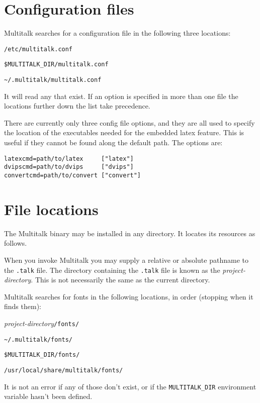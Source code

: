 \documentclass[12pt,a4paper,twoside]{article}
\renewcommand{\_}{\texttt{\symbol{95}}}
\begin{document}
\section{Configuration files}

Multitalk searches for a configuration file in the following three
locations:
\begin{bulletlist}
\item \verb^/etc/multitalk.conf^
\item \verb^$MULTITALK_DIR/multitalk.conf^
\item \verb^~/.multitalk/multitalk.conf^
\end{bulletlist}

It will read any that exist. If an option is specified in more than
one file the locations further down the list take precedence.

There are currently only three config file options, and they are all
used to specify the location of the executables needed for the embedded
latex feature. This is useful if they cannot be found along the default
path. The options are:

\begin{verbatim}
latexcmd=path/to/latex     ["latex"]
dvipscmd=path/to/dvips     ["dvips"]
convertcmd=path/to/convert ["convert"]
\end{verbatim}

\section{File locations}

The Multitalk binary may be installed in any directory.
It locates its resources as follows.

When you invoke Multitalk you may supply a relative or absolute
pathname to the \verb=.talk= file. The directory containing
the \verb^.talk^ file is known as the \textit{project-directory}.
This is not necessarily the same as the current directory.

Multitalk searches for fonts in the following locations, in order
(stopping when it finds them):
\begin{numericlist}
\item \textit{project-directory}\verb^/fonts/^
\item \verb^~/.multitalk/fonts/^
\item \verb^$MULTITALK_DIR/fonts/^
\item \verb^/usr/local/share/multitalk/fonts/^
\end{numericlist}
It is not an error if any of those don't exist, or if the
\verb^MULTITALK_DIR^ environment variable hasn't been defined.
\end{document}
